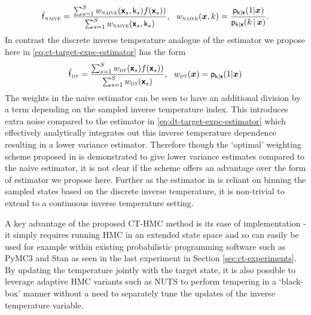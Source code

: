 \begin{equation}\label{eq:naive-target-expc-estimator}
  \hatf_{\textsc{naive}} = 
  \frac{\sum_{s=1}^S w_{\textsc{naive}}(\rvct{x}_s, \rvar{k}_s)f(\rvct{x}_s))}{\sum_{s=1}^S w_{\textsc{naive}}(\rvct{x}_s, \rvar{k}_s)},~~
  w_{\textsc{naive}}(\vct{x},k) = \frac{\pden{\rvar{k}|\rvct{x}}(1|\vct{x})}{\pden{\rvar{k}|\rvct{x}}(k\gvn\vct{x})}.
\end{equation}
In contrast the discrete inverse temperature analogue of the estimator we propose here in \eqref{eq:ct-target-expc-estimator} has the form
\begin{equation}\label{eq:dt-target-expc-estimator}
  \hatf_{\textsc{dt}} = 
  \frac{\sum_{s=1}^S w_{\textsc{dt}}(\rvct{x}_s)f(\rvct{x}_s))}{\sum_{s=1}^S w_{\textsc{dt}}(\rvct{x}_s)},~~
  w_{\textsc{dt}}(\vct{x}) = \pden{\rvar{k}|\rvct{x}}(1|\vct{x})
\end{equation}
The weights in the naive estimator can be seen to have an additional division by a term depending on the sampled inverse temperature index. This introduces extra noise compared to the estimator in \eqref{eq:dt-target-expc-estimator} which effectively analytically integrates out this inverse temperature dependence resulting in a lower variance estimator. Therefore though the `optimal' weighting scheme proposed in \citep{gramacy2010importance} is demonstrated to give lower variance estimates compared to the naive estimator, it is not clear if the scheme offers an advantage over the form of estimator we propose here. Further as the estimator in \citep{gramacy2010importance} is reliant on binning the sampled states based on the discrete inverse temperature, it is non-trivial to extend to a continuous inverse temperature setting.

A key advantage of the proposed \ac{CT-HMC} method is its ease of implementation - it simply requires running \ac{HMC} in an extended state space and so can easily be used for example within existing probabilistic programming software such as PyMC3 \citep{salvatier2016probabilistic} and Stan \citep{carpenter2016stan} as seen in the last experiment in Section \ref{sec:ct-experiments}. By updating the temperature jointly with the target state, it is also possible to leverage adaptive \ac{HMC} variants such as \ac{NUTS} \citep{hoffman2014no} to perform tempering in a `black-box' manner without a need to separately tune the updates of the inverse temperature variable.


